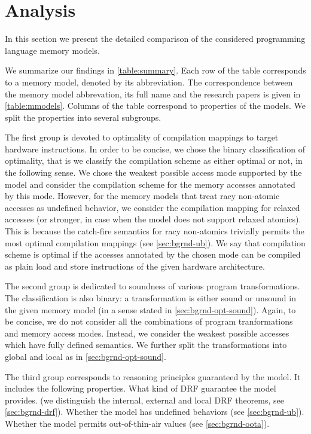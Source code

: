 \section{Analysis}

In this section we present the detailed comparison 
of the considered programming language memory models. 

We summarize our findings in \cref{table:summary}. 
Each row of the table corresponds to a memory model, denoted by its abbreviation. 
The correspondence between the memory model abbrevation, 
its full name and the research papers is given in \cref{table:mmodels}.
Columns of the table correspond to properties of the models. 
We split the properties into several subgroups. 

The first group is devoted to optimality of compilation mappings
to target hardware instructions. In order to be concise, 
we chose the binary classification of optimality, 
that is we classify the compilation scheme as either optimal or not,
in the following sense.
We chose the weakest possible access mode supported by the model
and consider the compilation scheme for the memory accesses annotated by this mode. 
However, for the memory models that treat racy non-atomic accesses
as undefined behavior, we consider the compilation mapping
for relaxed accesses (or stronger, in case when the model does not support relaxed atomics).  
This is because the catch-fire semantics for racy non-atomics 
trivially permits the most optimal compilation mappings (see \cref{sec:bgrnd-ub}).
We say that compilation scheme is optimal if the accesses annotated by the chosen mode 
can be compiled as plain load and store instructions of the given hardware architecture. 

The second group is dedicated to soundness of various program transformations. 
The classification is also binary: a transformation is either sound or unsound 
in the given memory model (in a sense stated in \cref{sec:bgrnd-opt-sound}).
Again, to be concise, we do not consider all the combinations 
of program tranformations and memory access modes. 
Instead, we consider the weakest possible accesses which have fully defined semantics. 
We further split the transformations into global and local as in \cref{sec:bgrnd-opt-sound}.

The third group corresponds to reasoning principles guaranteed by the model. 
It includes the following properties. What kind of DRF guarantee the model provides.
(we distinguish the internal, external and local DRF theorems, see \cref{sec:bgrnd-drf}).
Whether the model has undefined behaviors (see \cref{sec:bgrnd-ub}).
Whether the model permits out-of-thin-air values (see \cref{sec:bgrnd-oota}).

